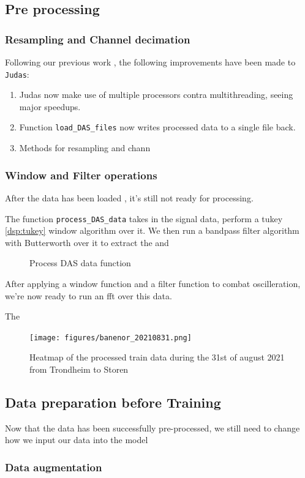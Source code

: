 \subsection{Pre processing}

\subsubsection{Resampling and Channel decimation}

Following our previous work \cite{projthesis}, the following improvements have been made to \texttt{Judas}: 

\begin{enumerate}
    \item Judas now make use of multiple processors contra multithreading, seeing major speedups.
    \item Function \texttt{load\_DAS\_files} now writes processed data to a single file back.
    \item Methods for resampling and chann
\end{enumerate}


\subsubsection{Window and Filter operations}

After the data has been loaded \cite{projthesis}, it's still not ready for processing. 

The function \lstinline|process_DAS_data| takes in the signal data, perform a tukey \ref{dsp:tukey} window algorithm over it. We then run a bandpass filter algorithm with Butterworth over it to extract the and 

\begin{figure}[h]
    \centering
    
    \caption{Process DAS data function}
    \label{fig:procdasdata}
\end{figure}


After applying a window function and a filter function to combat oscilleration, we're now ready to run an fft over this data. 


The 

\begin{figure}[h]
    \centering
    \texttt{[image: figures/banenor\_20210831.png]}
    \caption{Heatmap of the processed train data during the 31st of august 2021 from Trondheim to Storen}
    \label{fig:trdstrdas}
\end{figure}

\subsection{Data preparation before Training} 

Now that the data has been successfully pre-processed, we still need to change how we input our data into the model


\subsubsection{Data augmentation}
